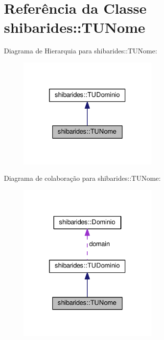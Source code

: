 \hypertarget{classshibarides_1_1TUNome}{}\section{Referência da Classe shibarides\+:\+:T\+U\+Nome}
\label{classshibarides_1_1TUNome}


Diagrama de Hierarquia para shibarides\+:\+:T\+U\+Nome\+:\nopagebreak
\begin{figure}[H]
\begin{center}
\leavevmode
\includegraphics[width=196pt]{classshibarides_1_1TUNome__inherit__graph}
\end{center}
\end{figure}


Diagrama de colaboração para shibarides\+:\+:T\+U\+Nome\+:\nopagebreak
\begin{figure}[H]
\begin{center}
\leavevmode
\includegraphics[width=196pt]{classshibarides_1_1TUNome__coll__graph}
\end{center}
\end{figure}
